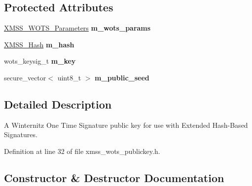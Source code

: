 \subsection*{Protected Attributes}
\begin{DoxyCompactItemize}
\item 
\mbox{\label{class_botan_1_1_x_m_s_s___w_o_t_s___public_key_a11beeb3655746decd959eb4746276d90}} 
\mbox{\hyperlink{class_botan_1_1_x_m_s_s___w_o_t_s___parameters}{X\+M\+S\+S\+\_\+\+W\+O\+T\+S\+\_\+\+Parameters}} {\bfseries m\+\_\+wots\+\_\+params}
\item 
\mbox{\label{class_botan_1_1_x_m_s_s___w_o_t_s___public_key_a9c07ed5994e1acbef9b050e8b09800a6}} 
\mbox{\hyperlink{class_botan_1_1_x_m_s_s___hash}{X\+M\+S\+S\+\_\+\+Hash}} {\bfseries m\+\_\+hash}
\item 
\mbox{\label{class_botan_1_1_x_m_s_s___w_o_t_s___public_key_a09231d6a72a58f807e5de062cf6c5e4e}} 
wots\+\_\+keysig\+\_\+t {\bfseries m\+\_\+key}
\item 
\mbox{\label{class_botan_1_1_x_m_s_s___w_o_t_s___public_key_a411ae75931b2ee99e012987f1255f331}} 
secure\+\_\+vector$<$ uint8\+\_\+t $>$ {\bfseries m\+\_\+public\+\_\+seed}
\end{DoxyCompactItemize}


\subsection{Detailed Description}
A Winternitz One Time Signature public key for use with Extended Hash-\/\+Based Signatures. 

Definition at line 32 of file xmss\+\_\+wots\+\_\+publickey.\+h.



\subsection{Constructor \& Destructor Documentation}
\mbox{\label{class_botan_1_1_x_m_s_s___w_o_t_s___public_key_a7fb721c64c4e4e95d7b253e24942dfe0}} 
